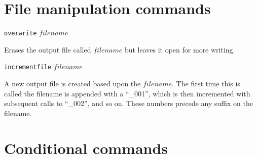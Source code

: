 \documentclass {book}
\newcommand {\ttt} {\texttt}
\begin{document}
\section{File manipulation commands}

\begin{description}

\item{\ttt{overwrite} $filename$}

Erases the output file called $filename$ but leaves it open for more writing.

\item{\ttt{incrementfile} $filename$}

A new output file is created based upon the $filename$. The first time this is called the filename is appended with a ``\_001'', which is then incremented with subsequent calls to ``\_002'', and so on. These numbers precede any suffix on the filename.

\end{description}

\section{Conditional commands}
\end{document}
